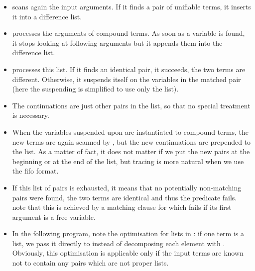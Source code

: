 \begin{itemize}
\item {} scans again the input arguments.
If it finds a pair of unifiable terms, it inserts it into
a difference list.

\item {} processes the arguments of compound terms.
As soon as a variable is found, it stops looking at following
arguments but it appends them into the difference list.

\item {} processes this list.
If it finds an identical pair, it succeeds, the two terms
are different.
Otherwise, it suspends itself on the variables in the matched
pair (here the suspending is simplified to use only the 
list).

\item The continuations are just other pairs in the list,
so that no special treatment is necessary.

\item When the variables suspended upon are instantiated
to compound terms, the new terms are again scanned by ,
but the new continuations are prepended to the list.
As a matter of fact, it does not matter if we put the new
pairs at the beginning or at the end of the list,
but tracing is more natural when we use the fifo format.

\item If this list of pairs is exhausted, it means that
no potentially non-matching pairs were found, the two
terms are identical and thus the predicate fails.
note that this is achieved by a matching clause
for  which fails if its first
argument is a free variable.

\item In the following program,
note the optimisation for lists in :
if one term is a list, we pass it directly to 
instead of decomposing each element with
.
Obviously, this optimisation is applicable only if the input
terms are known not to contain any pairs which are not proper lists.
\end{itemize}

\vfill %

